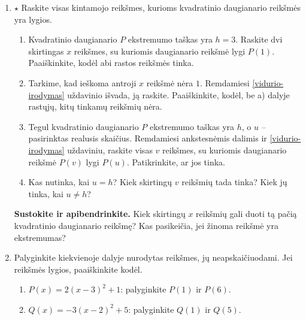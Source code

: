 \documentclass[12pt,a4paper]{article}
\begin{document}
\begin{enumerate}
\begin{enumerate}
\item Jeigu $P(3)=P(3)$, tai ekstremumo taškas yra $3$.
\item Jeigu $h=2$ ir $P(0)=5$, tai $P(4)=5$.
\item Jeigu $P(1)=P(7)$, tai būtinai $P(2)=P(5)$.
\end{enumerate}
\item $\star$ Raskite visas kintamojo reikšmes, kurioms kvadratinio daugianario reikšmės yra lygios.
\begin{enumerate}
\item Kvadratinio daugianario $P$ ekstremumo taškas yra $h=3$. Raskite dvi skirtingas $x$ reikšmes, su kuriomis daugianario reikšmė lygi $P(1)$. Paaiškinkite, kodėl abi rastos reikšmės tinka.
\begin{center}\end{center}
\item Tarkime, kad ieškoma antroji $x$ reikšmė nėra $1$. Remdamiesi \ref{vidurio-irodymas} uždavinio išvada, ją raskite. Paaiškinkite, kodėl, be a) dalyje rastųjų, kitų tinkamų reikšmių nėra.
\item Tegul kvadratinio daugianario $P$ ekstremumo taškas yra $h$, o $u$ – pasirinktas realusis skaičius. Remdamiesi ankstesnėmis dalimis ir \ref{vidurio-irodymas} uždaviniu, raskite visas $v$ reikšmes, su kuriomis daugianario reikšmė $P(v)$ lygi $P(u)$. Patikrinkite, ar jos tinka.
\item Kas nutinka, kai $u=h$? Kiek skirtingų $v$ reikšmių tada tinka? Kiek jų tinka, kai $u\ne h$?
\end{enumerate}
\par\medskip
\textbf{Sustokite ir apibendrinkite.} Kiek skirtingų $x$ reikšmių gali duoti tą pačią kvadratinio daugianario reikšmę? Kas pasikeičia, jei žinoma reikšmė yra ekstremumas?
\item Palyginkite kiekvienoje dalyje nurodytas reikšmes, jų neapskaičiuodami. Jei reikšmės lygios, paaiškinkite kodėl.
\begin{enumerate}
\item $P(x)=2(x-3)^2+1$: palyginkite $P(1)$ ir $P(6)$.
\item $Q(x)=-3(x-2)^2+5$: palyginkite $Q(1)$ ir $Q(5)$.

\end{enumerate}
\end{enumerate}
\end{document}
